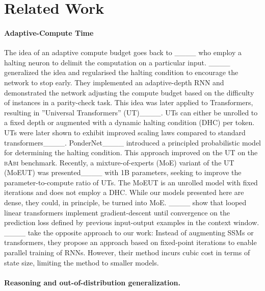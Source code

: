 \section{Related Work}
\paragraph{Adaptive-Compute Time} The idea of an adaptive compute budget goes back to ____ who employ a halting neuron to delimit the computation on a particular input. ____ generalized the idea and regularised the halting condition to encourage the network to stop early.
They implemented an adaptive-depth RNN and demonstrated the network adjusting the compute budget based on the difficulty of instances in a parity-check task.
This idea was later applied to Transformers, resulting in ''Universal Transformers'' (UT)____. UTs can either be unrolled to a fixed depth or augmented with a dynamic halting condition (DHC) per token.
UTs were later shown to exhibit improved scaling laws compared to standard transformers____.
PonderNet____ introduced a principled probabilistic model for determining the halting condition. This approach improved on the UT on the \textsc{bAbi} benchmark.
Recently, a mixture-of-experts (MoE) variant of the UT (MoEUT) was presented____ with 1B parameters, seeking to improve the parameter-to-compute ratio of UTs.
The MoEUT is an unrolled model with fixed iterations and does not employ a DHC. While our models presented here are dense, they could, in principle, be turned into MoE. 
____ show that looped linear transformers implement gradient-descent until convergence on the prediction loss defined by previous input-output examples in the context window.
____ take the opposite approach to our work:
Instead of augmenting SSMs or transformers, they propose an approach based on fixed-point iterations to enable parallel training of RNNs.
However, their method incurs cubic cost in terms of state size, limiting the method to smaller models. 

\paragraph{Reasoning and out-of-distribution generalization.}

